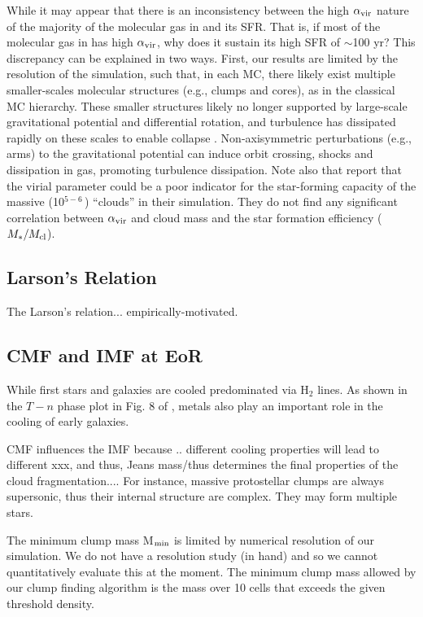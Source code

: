 \documentclass[apj]{emulateapj} %
\begin{document}
While it may appear that there is an inconsistency between the high $\alpha_{\rm vir}$ 
nature of the majority of the molecular gas in \flower and its SFR. 
That is, if most of the molecular gas in \flower has high $\alpha_{\rm vir}$, why does it sustain its high SFR of $\sim$100\,\Msun\,yr\pmOne?
This discrepancy can be explained in two ways. 
First, our results are limited by the resolution of the simulation, such that, in each MC, there 
likely exist multiple smaller-scales molecular structures (e.g., clumps and cores), 
as in the classical MC hierarchy. These smaller structures likely no longer supported by large-scale gravitational potential and differential rotation, 
and turbulence has dissipated rapidly on these scales to enable collapse \citep{Clark04a}.
Non-axisymmetric perturbations (e.g., arms) to the gravitational potential 
can induce orbit crossing, shocks and dissipation in gas, promoting turbulence dissipation.
Note also that \citet{Pettitt18a} report that the virial parameter could be a poor indicator 
for the star-forming capacity of the massive (10$^{5-6}$\,\Msun) ``clouds'' in their simulation. They 
do not find any significant correlation between $\alpha_{\rm vir}$ and cloud mass 
and the star formation efficiency ($M_*/M_{\rm cl}$).



\subsection{Larson's Relation}
The Larson's relation... empirically-motivated.


\subsection{CMF and IMF at EoR}



While first stars and galaxies are cooled predominated via H$_2$ lines. 
As shown in the $T-n$ phase plot in Fig. 8 of \citealt{Pallottini17b}, metals also play an important role in the cooling of early galaxies.


CMF influences the IMF because .. different cooling properties will lead to different xxx, and thus, Jeans mass/thus determines the final properties of the cloud fragmentation....  For instance, massive protostellar clumps are always supersonic, thus their internal structure are complex. They may form multiple stars.


The minimum clump mass M$_{\rm min}$ is limited by numerical resolution of our simulation. We do not have a resolution study (in hand) and so we cannot quantitatively evaluate this at the moment. The minimum clump mass allowed 
by our clump finding algorithm is the mass over 10 cells that exceeds the given threshold density.
\end{document}
